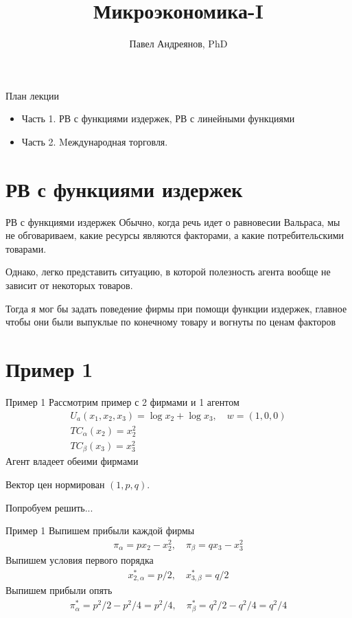 \documentclass{beamer}
\title{
Микроэкономика-I
}
\author{
Павел Андреянов, PhD
}
\begin{document}
\maketitle

\begin{frame}{План лекции}
\begin{itemize}
  \item Часть 1. РВ с функциями издержек, РВ с линейными функциями
  \item Часть 2. Mеждународная торговля.
\end{itemize}
\end{frame}

\section{РВ с функциями издержек}

\begin{frame}{РВ с функциями издержек}
Обычно, когда речь идет о равновесии Вальраса, мы не обговариваем, какие ресурсы являются факторами, а какие потребительскими товарами.

Однако, легко представить ситуацию, в которой полезность агента вообще не зависит от некоторых товаров.

Тогда я мог бы задать поведение фирмы при помощи функции издержек, главное чтобы они были выпуклые по конечному товару и вогнуты по ценам факторов
\end{frame}

\section{Пример 1}

\begin{frame}{Пример 1}
Рассмотрим пример с 2 фирмами и 1 агентом
\begin{gather*}
	U_a(x_1, x_2, x_3) = \log x_2 + \log x_3, \quad w = (1,0,0)\\
	TC_{\alpha}(x_2) = x_2^2 \\
	TC_{\beta}(x_3) = x_3^2 
\end{gather*}
Агент владеет обеими фирмами

Вектор цен нормирован $(1, p, q)$.

Попробуем решить...
\end{frame}

\begin{frame}{Пример 1}
Выпишем прибыли каждой фирмы
\begin{gather*}
	\pi_{\alpha} = p x_2 - x_2^2, \quad 
	\pi_{\beta} = q x_3 - x_3^2
\end{gather*}
Выпишем условия первого порядка
\begin{gather*}
	x^*_{2,\alpha} = p/2, \quad 
	x^*_{3,\beta} = q/2
\end{gather*}
Выпишем прибыли опять
\begin{gather*}
	\pi^*_{\alpha} = p^2/2 - p^2/4 = p^2/4, \quad 
	\pi^*_{\beta} = q^2/2 - q^2/4 = q^2/4
\end{gather*}
\end{frame}
\end{document}
